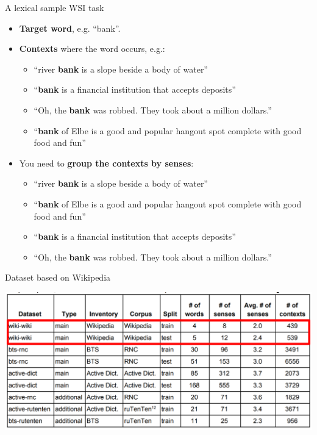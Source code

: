 \begin{frame}{A lexical sample WSI task}
  
  \begin{itemize}
  	\item \textbf{Target word}, e.g. ``bank''.
  	
  	\pause 
  	
  	\item \textbf{Contexts} where the word occurs, e.g.: 
  	\begin{itemize}
  	\item ``river \textbf{bank} is a slope beside a body of water''
  	\item ``\textbf{bank} is a financial institution that accepts deposits''
  	\item ``Oh, the \textbf{bank} was robbed. They took about a million dollars.''
  	\item ``\textbf{bank} of Elbe is a good and popular hangout spot complete with good food and fun''
  	\end{itemize}
  	
  	\pause 
  	
  	\item You need to \textbf{{group} the contexts by senses}:
  	\begin{itemize}
  	\item \textcolor{Cerulean}{``river \textbf{bank} is a slope beside a body of water''}
  	\item \textcolor{Cerulean}{``\textbf{bank} of Elbe is a good and popular hangout spot complete with good food and fun''}
  	\item \alert{``\textbf{bank} is a financial institution that accepts deposits''}
  	\item \alert{``Oh, the \textbf{bank} was robbed. They took about a million dollars.''}
  	\end{itemize}
  	 
  \end{itemize}
  
\end{frame}


\begin{frame}{Dataset based on Wikipedia}

{\centering
\includegraphics[width=1.0\textwidth]{figures/datasets1}
}	
\end{frame}


